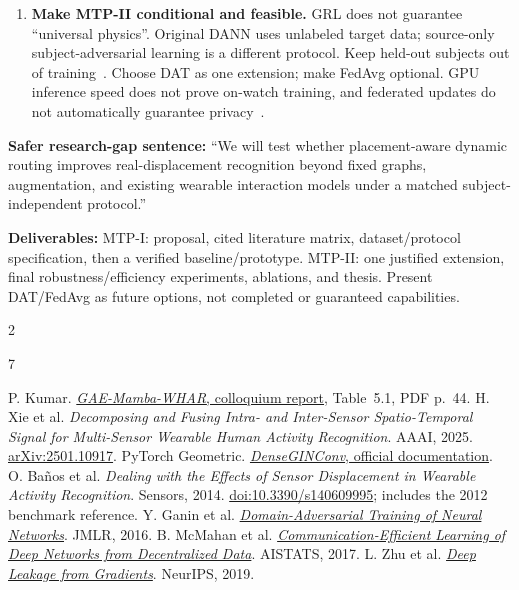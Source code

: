 \documentclass[10pt]{article}
\begin{document}
\begin{enumerate}
\item \textbf{Make MTP-II conditional and feasible.} GRL does not guarantee ``universal physics''. Original DANN uses unlabeled target data; source-only subject-adversarial learning is a different protocol. Keep held-out subjects out of training~\cite{dann}. Choose DAT as one extension; make FedAvg optional. GPU inference speed does not prove on-watch training, and federated updates do not automatically guarantee privacy~\cite{fedavg,leakage}.
\end{enumerate}

\textbf{Safer research-gap sentence:} ``We will test whether placement-aware dynamic routing improves real-displacement recognition beyond fixed graphs, augmentation, and existing wearable interaction models under a matched subject-independent protocol.''

\textbf{Deliverables:} MTP-I: proposal, cited literature matrix, dataset/protocol specification, then a verified baseline/prototype. MTP-II: one justified extension, final robustness/efficiency experiments, ablations, and thesis. Present DAT/FedAvg as future options, not completed or guaranteed capabilities.

\vspace{-4pt}
\begin{multicols}{2}
\fontsize{8.5}{9.5}\selectfont
\begin{thebibliography}{7}
\raggedright
\setlength{\itemsep}{1pt}
\setlength{\parskip}{0pt}
 P. Kumar. \href{colloquium_report.pdf}{\emph{GAE-Mamba-WHAR}, colloquium report}, Table~5.1, PDF p.~44.
 H. Xie et al. \emph{Decomposing and Fusing Intra- and Inter-Sensor Spatio-Temporal Signal for Multi-Sensor Wearable Human Activity Recognition}. AAAI, 2025. \href{https://arxiv.org/abs/2501.10917}{arXiv:2501.10917}.
 PyTorch Geometric. \href{https://pytorch-geometric.readthedocs.io/en/latest/generated/torch_geometric.nn.dense.DenseGINConv.html}{\emph{DenseGINConv}, official documentation}.
\columnbreak
{} O. Ba\~nos et al. \emph{Dealing with the Effects of Sensor Displacement in Wearable Activity Recognition}. Sensors, 2014. \href{https://doi.org/10.3390/s140609995}{doi:10.3390/s140609995}; includes the 2012 benchmark reference.
 Y. Ganin et al. \href{https://www.jmlr.org/papers/v17/15-239.html}{\emph{Domain-Adversarial Training of Neural Networks}}. JMLR, 2016.
 B. McMahan et al. \href{https://proceedings.mlr.press/v54/mcmahan17a.html}{\emph{Communication-Efficient Learning of Deep Networks from Decentralized Data}}. AISTATS, 2017.
 L. Zhu et al. \href{https://arxiv.org/abs/1906.08935}{\emph{Deep Leakage from Gradients}}. NeurIPS, 2019.
\end{thebibliography}
\end{multicols}
\end{document}
